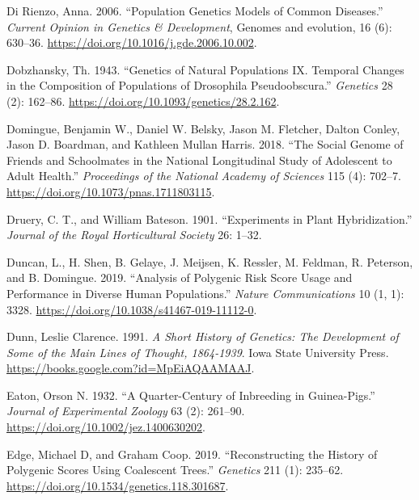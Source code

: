 \documentclass[
]{book}
\newlength{\cslhangindent}
\newlength{\cslentryspacingunit} %
\newenvironment{CSLReferences}[2] %
 {%
  \setlength{\parindent}{0pt}
  \ifodd #1
  \let\oldpar\par
  \def\par{\hangindent=\cslhangindent\oldpar}
  \fi
  \setlength{\parskip}{#2\cslentryspacingunit}
 }%
 {}
\begin{document}
\begin{CSLReferences}{1}{0}
\leavevmode{}%
Di Rienzo, Anna. 2006. {``Population Genetics Models of Common Diseases.''} \emph{Current Opinion in Genetics \& Development}, Genomes and evolution, 16 (6): 630--36. \url{https://doi.org/10.1016/j.gde.2006.10.002}.

\leavevmode{}%
Dobzhansky, Th. 1943. {``Genetics of Natural Populations {IX}. {Temporal} Changes in the Composition of Populations of Drosophila Pseudoobscura.''} \emph{Genetics} 28 (2): 162--86. \url{https://doi.org/10.1093/genetics/28.2.162}.

\leavevmode{}%
Domingue, Benjamin W., Daniel W. Belsky, Jason M. Fletcher, Dalton Conley, Jason D. Boardman, and Kathleen Mullan Harris. 2018. {``The Social Genome of Friends and Schoolmates in the {National Longitudinal Study} of {Adolescent} to {Adult Health}.''} \emph{Proceedings of the National Academy of Sciences} 115 (4): 702--7. \url{https://doi.org/10.1073/pnas.1711803115}.

\leavevmode{}%
Druery, C. T., and William Bateson. 1901. {``Experiments in Plant Hybridization.''} \emph{Journal of the Royal Horticultural Society} 26: 1--32.

\leavevmode{}%
Duncan, L., H. Shen, B. Gelaye, J. Meijsen, K. Ressler, M. Feldman, R. Peterson, and B. Domingue. 2019. {``Analysis of Polygenic Risk Score Usage and Performance in Diverse Human Populations.''} \emph{Nature Communications} 10 (1, 1): 3328. \url{https://doi.org/10.1038/s41467-019-11112-0}.

\leavevmode{}%
Dunn, Leslie Clarence. 1991. \emph{A {Short History} of {Genetics}: {The Development} of {Some} of the {Main Lines} of {Thought}, 1864-1939}. {Iowa State University Press}. \url{https://books.google.com?id=MpEiAQAAMAAJ}.

\leavevmode{}%
Eaton, Orson N. 1932. {``A Quarter-Century of Inbreeding in Guinea-Pigs.''} \emph{Journal of Experimental Zoology} 63 (2): 261--90. \url{https://doi.org/10.1002/jez.1400630202}.

\leavevmode{}%
Edge, Michael D, and Graham Coop. 2019. {``Reconstructing the {History} of {Polygenic Scores Using Coalescent Trees}.''} \emph{Genetics} 211 (1): 235--62. \url{https://doi.org/10.1534/genetics.118.301687}.


\end{CSLReferences}
\end{document}
